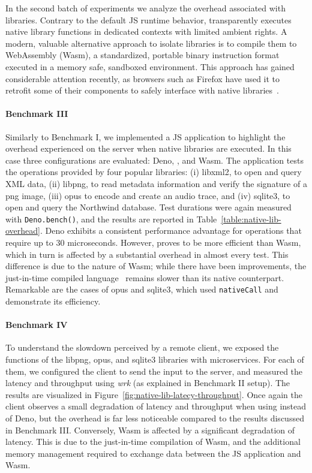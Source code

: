 In the second batch of experiments we analyze the overhead associated
with libraries. Contrary to the default JS runtime behavior, \natisand
transparently executes native library functions in dedicated contexts
with limited ambient rights. A modern, valuable alternative approach
to isolate libraries is to compile them to WebAssembly (Wasm), a
standardized, portable binary instruction format executed in a memory
safe, sandboxed environment. This approach has gained considerable
attention recently, as browsers such as Firefox have used it to
retrofit some of their components to safely interface with native
libraries~\cite{RLBox}.

\paragraph{Benchmark III}
%
Similarly to Benchmark I, we implemented a JS application to highlight
the overhead experienced on the server when native libraries are
executed. In this case three configurations are evaluated: Deno, \natisand,
and Wasm. The application tests the operations provided by four
popular libraries: (i) libxml2, to open and query XML data, (ii) libpng, to read metadata information and verify the
signature of a png image, (iii) opus to encode and create an audio
trace, and (iv) sqlite3, to open and query the Northwind
database. Test durations were again measured with {\tt Deno.bench()},
and the results are reported in
Table~\ref{table:native-lib-overhead}. Deno
exhibits a consistent performance advantage for operations that
require up to 30 microseconds. However, \natisand proves to be more
efficient than Wasm, which in turn is affected by a substantial
overhead in almost every test. This difference is due to the nature of
Wasm; while there have been improvements, the just-in-time
compiled language~\cite{wasm-compilation-pipeline}
remains slower than its native counterpart. Remarkable are the cases
of opus and sqlite3, which used {\tt nativeCall} and demonstrate its
efficiency.

\paragraph{Benchmark IV}
%
To understand the slowdown perceived by a remote client, we exposed
the functions of the libpng, opus, and sqlite3 libraries with
microservices. For each of them, we configured the client to send the
input to the server, and measured the latency and throughput using
{\em wrk} (as explained in Benchmark II setup). The results are
visualized in Figure~\ref{fig:native-lib-latecy-throughput}. Once
again the client observes a small degradation of
latency and throughput when using \natisand instead of Deno, but the
overhead is far less noticeable compared to the results discussed in
Benchmark III. Conversely, Wasm is affected by a significant
degradation of latency. This is due to the just-in-time compilation of Wasm, and the additional memory
management required to exchange data between the JS application and
Wasm.

